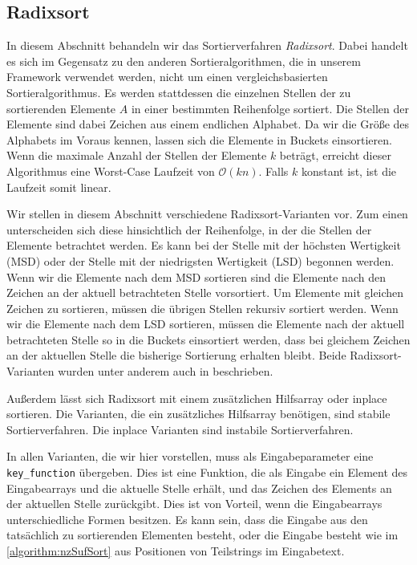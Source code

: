 \subsection{Radixsort}
\label{sort:radix}


In  diesem Abschnitt behandeln wir das Sortierverfahren \emph{Radixsort}.
Dabei handelt es sich im Gegensatz zu den anderen Sortieralgorithmen, die in unserem Framework verwendet werden,
nicht um einen vergleichsbasierten Sortieralgorithmus.
Es werden stattdessen die einzelnen Stellen der zu sortierenden Elemente $A$ in einer bestimmten Reihenfolge sortiert.
Die Stellen der Elemente sind dabei Zeichen aus einem endlichen Alphabet.
Da wir die Größe des Alphabets im Voraus kennen, lassen sich die Elemente in Buckets einsortieren.
Wenn die maximale Anzahl der Stellen der Elemente $k$ beträgt,
erreicht dieser Algorithmus eine Worst-Case Laufzeit von $\mathcal O(kn)$.
Falls $k$ konstant ist, ist die Laufzeit somit linear.

Wir stellen in diesem Abschnitt verschiedene Radixsort-Varianten vor.
Zum einen unterscheiden sich diese hinsichtlich der Reihenfolge,
in der die Stellen der Elemente betrachtet werden.
Es kann bei der Stelle mit der höchsten Wertigkeit (MSD) oder der Stelle mit der niedrigsten Wertigkeit (LSD) begonnen werden.
Wenn wir die Elemente nach dem MSD sortieren sind die Elemente nach den Zeichen an der aktuell betrachteten Stelle vorsortiert.
Um Elemente mit gleichen Zeichen zu sortieren, müssen die übrigen Stellen rekursiv sortiert werden.
Wenn wir die Elemente nach dem LSD sortieren,
müssen die Elemente nach der aktuell betrachteten Stelle so in die Buckets einsortiert werden,
dass bei gleichem Zeichen an der aktuellen Stelle die bisherige Sortierung erhalten bleibt.
Beide Radixsort-Varianten wurden unter anderem auch in \cite{Cormen2009} beschrieben.

Außerdem lässt sich Radixsort mit einem zusätzlichen Hilfsarray oder inplace sortieren.
Die Varianten, die ein zusätzliches Hilfsarray benötigen, sind stabile Sortierverfahren.
Die inplace Varianten sind instabile Sortierverfahren.

In allen Varianten, die wir hier vorstellen,
muss als Eingabeparameter eine \texttt{key\_function} übergeben.
Dies ist eine Funktion, die als Eingabe ein Element des Eingabearrays und die aktuelle Stelle erhält,
und das Zeichen des Elements an der aktuellen Stelle zurückgibt.
Dies ist von Vorteil, wenn die Eingabearrays unterschiedliche Formen besitzen.
Es kann sein, dass die Eingabe aus den tatsächlich zu sortierenden Elementen besteht,
oder die Eingabe besteht wie im \cref{algorithm:nzSufSort} aus Positionen von Teilstrings im Eingabetext.

